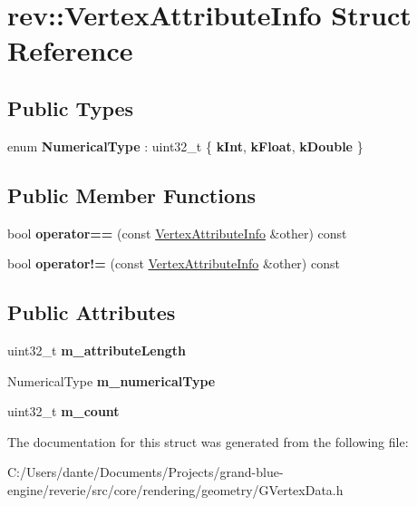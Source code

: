 \hypertarget{structrev_1_1_vertex_attribute_info}{}\section{rev\+::Vertex\+Attribute\+Info Struct Reference}
\label{structrev_1_1_vertex_attribute_info}
\subsection*{Public Types}
\begin{DoxyCompactItemize}
\item 
\mbox{\label{structrev_1_1_vertex_attribute_info_a236de3dd066ca41eaea05ce2e5c9768f}} 
enum {\bfseries Numerical\+Type} \+: uint32\+\_\+t \{ {\bfseries k\+Int}, 
{\bfseries k\+Float}, 
{\bfseries k\+Double}
 \}
\end{DoxyCompactItemize}
\subsection*{Public Member Functions}
\begin{DoxyCompactItemize}
\item 
\mbox{\label{structrev_1_1_vertex_attribute_info_af5f06e1fb680eebe3fed130a2f421a3a}} 
bool {\bfseries operator==} (const \mbox{\hyperlink{structrev_1_1_vertex_attribute_info}{Vertex\+Attribute\+Info}} \&other) const
\item 
\mbox{\label{structrev_1_1_vertex_attribute_info_a94a7dfa4ec9602b57e0cda51b16706c7}} 
bool {\bfseries operator!=} (const \mbox{\hyperlink{structrev_1_1_vertex_attribute_info}{Vertex\+Attribute\+Info}} \&other) const
\end{DoxyCompactItemize}
\subsection*{Public Attributes}
\begin{DoxyCompactItemize}
\item 
\mbox{\label{structrev_1_1_vertex_attribute_info_affbebd8b5f20d673573eb2242f707a0c}} 
uint32\+\_\+t {\bfseries m\+\_\+attribute\+Length}
\item 
\mbox{\label{structrev_1_1_vertex_attribute_info_aad2832728f3c9064a05af5ca2e34f638}} 
Numerical\+Type {\bfseries m\+\_\+numerical\+Type}
\item 
\mbox{\label{structrev_1_1_vertex_attribute_info_ac46e05a2467c81f6aa3ce672e1c1a1ee}} 
uint32\+\_\+t {\bfseries m\+\_\+count}
\end{DoxyCompactItemize}


The documentation for this struct was generated from the following file\+:\begin{DoxyCompactItemize}
\item 
C\+:/\+Users/dante/\+Documents/\+Projects/grand-\/blue-\/engine/reverie/src/core/rendering/geometry/G\+Vertex\+Data.\+h\end{DoxyCompactItemize}
